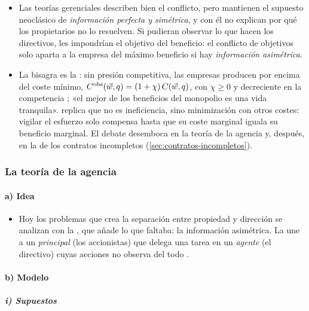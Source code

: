 \documentclass[11pt]{article}
\begin{document}
\begin{itemize}
\item Las teorías gerenciales describen bien el conflicto, pero mantienen el supuesto neoclásico de \emph{información perfecta y simétrica}, y con él no explican por qué los propietarios no lo resuelven. Si pudieran observar lo que hacen los directivos, les impondrían el objetivo del beneficio: el conflicto de objetivos solo aparta a la empresa del máximo beneficio si hay \emph{información asimétrica}.
\item La bisagra es la \nocite{Leibenstein1966Allocative}: sin presión competitiva, las empresas producen por encima del coste mínimo, $C^{\mathrm{obs}}(\vec{w},q)=(1+\chi)\,C(\vec{w},q)$, con $\chi\geq 0$ y decreciente en la competencia ; «el mejor de los beneficios del monopolio es una vida tranquila»\nocite{Hicks1935Annual}. \textcite{Stigler1976Xistence} replica que no es ineficiencia, sino minimización con otros costes: vigilar el esfuerzo solo compensa hasta que su coste marginal iguala su beneficio marginal. El debate desemboca en la teoría de la agencia y, después, en la de los contratos incompletos (\ref{sec:contratos-incompletos}).
\end{itemize}

\subsubsection{La teoría de la agencia}\label{sec:agencia}

\paragraph{a) Idea}

\begin{itemize}
\item Hoy los problemas que crea la separación entre propiedad y dirección se analizan con la , que añade lo que faltaba: la información asimétrica. La  une a un \emph{principal} (los accionistas) que delega una tarea en un \emph{agente} (el directivo) cuyas acciones no observa del todo .
\end{itemize}

\paragraph{b) Modelo}

\subparagraph{i) Supuestos}
\end{document}
